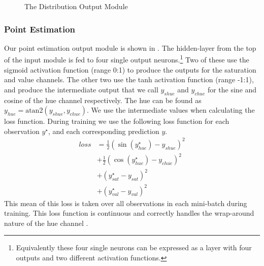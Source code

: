 \documentclass[]{book}
\newcommand{\parencite}{\citep}
\begin{document}
\begin{figure}
	\newcommand{\picwidth}{60pt}
	
	\caption{The Distribution Output Module \label{fig:distoutmod}}
\end{figure}


\subsubsection{Point Estimation}\label{sec:point-estimation}
Our point estimation output module is shown in .
The hidden-layer from the top of the input module is fed to  four single output neurons.\footnote{Equivalently these four single neurons can be expressed as a layer with four outputs and two different activation functions.}
Two of these use the sigmoid activation function (range 0:1) to produce the outputs for the saturation and value channels.
The other two use the tanh activation function (range -1:1), and produce the intermediate output that we call $y_{shue}$ and $y_{chue}$ for the sine and cosine of the hue channel respectively.
The hue can be found as $y_{hue} =  \mathrm{atan2} \left(y_{shue}, y_{chue} \right)$.
We use the intermediate values when calculating the loss function.
During training we use the following loss function for each observation $y^\star$, and each corresponding prediction $y$.
\begin{align}
loss &= %
\frac{1}{2} \left(\sin(y^\star_{hue}) - y_{shue} \right)^2     \nonumber \\
&+ \frac{1}{2} \left(\cos(y^\star_{hue}) - y_{chue} \right)^2  \nonumber \\
&+ \left(y^\star_{sat} - y_{sat} \right)^2  \nonumber \\
&+ \left(y^\star_{val} - y_{val} \right)^2 %
\end{align}
This mean of this loss is taken over all observations in each mini-batch during training.
This loss function is continuous and correctly handles the wrap-around nature of the hue channel \parencite{WhiteRepresentingAnglesSE}.
\end{document}
